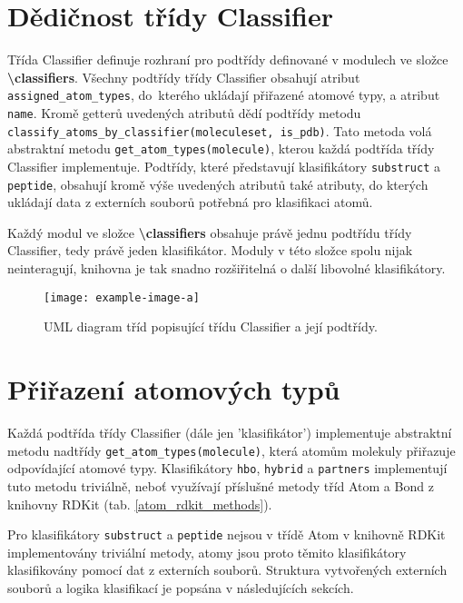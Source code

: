 \section{Dědičnost třídy Classifier}
Třída Classifier definuje rozhraní pro podtřídy definované v modulech ve složce \textbf{\textbackslash classifiers}. Všechny podtřídy třídy Classifier obsahují atribut \verb|assigned_atom_types|, do~kterého ukládají přiřazené atomové typy, a atribut \verb|name|. Kromě getterů uvedených atribu\-tů dědí podtřídy metodu \verb|classify_atoms_by_classifier(moleculeset, is_pdb)|. Ta\-to metoda volá abstraktní metodu \verb|get_atom_types(molecule)|, kterou každá podtřída třídy Classifier implementuje. Podtřídy, které představují klasifikátory \verb|substruct| a \verb|peptide|, obsahují kromě výše uvedených atributů také atributy, do kterých ukládají data z externích souborů potřebná pro klasifikaci atomů.

Každý modul ve složce \textbf{\textbackslash classifiers} obsahuje právě jednu podtřídu třídy Classifier, tedy právě jeden klasifikátor. Moduly v této složce spolu nijak neinteragují, knihovna je tak snadno rozšiřitelná o další libovolné klasifikátory. 

\bigskip
\begin{figure}[h]
    \centering
    \texttt{[image: example-image-a]}
    \caption{UML diagram tříd popisující třídu Classifier a její podtřídy.}
    \label{classes_UML}
\end{figure}

    
\section{Přiřazení atomových typů}
Každá podtřída třídy Classifier (dále jen 'klasifikátor') implementuje abstraktní metodu nadtřídy \verb|get_atom_types(molecule)|, která atomům molekuly přiřazuje odpovídající atomové typy. Klasifikátory \verb|hbo|, \verb|hybrid| a \verb|partners| implementují tuto metodu triviálně, neboť využívají příslušné metody tříd Atom a Bond z knihovny RDKit (tab.  \ref{atom_rdkit_methods}). 

Pro klasifikátory \verb|substruct| a \verb|peptide| nejsou v třídě Atom v knihovně RDKit implementovány triviální metody, atomy jsou proto těmito klasifikátory klasifikovány pomocí dat z externích souborů. Struktura vytvořených externích souborů a logika  klasifikací je popsána v následujících sekcích. 

